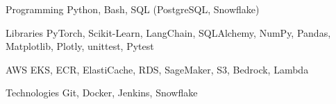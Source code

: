 


\begin{cvskills}


\cvskill
{Programming} %
{Python, Bash, SQL (PostgreSQL, Snowflake)} %


\cvskill
{Libraries} %
{PyTorch, Scikit-Learn, LangChain, SQLAlchemy, NumPy, Pandas, Matplotlib, Plotly, unittest, Pytest} %


\cvskill
{AWS} %
{EKS, ECR, ElastiCache, RDS, SageMaker, S3, Bedrock, Lambda} %


\cvskill
{Technologies} %
{Git, Docker, Jenkins, Snowflake} %


\end{cvskills}